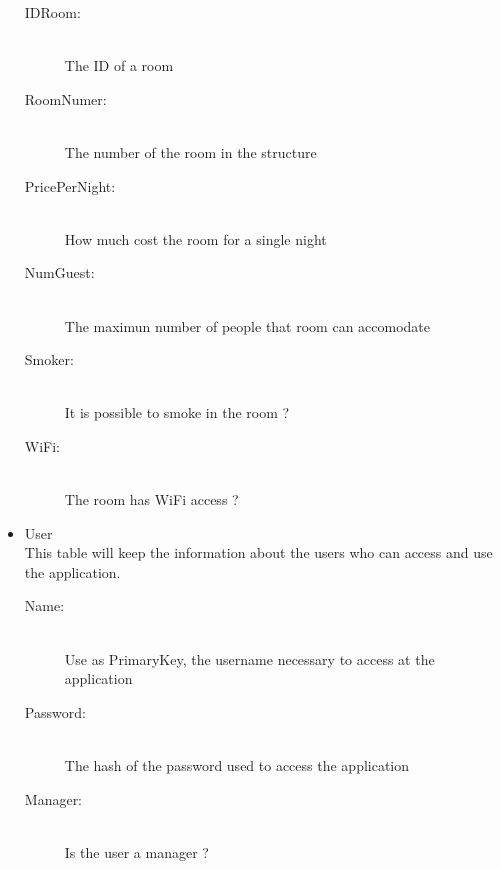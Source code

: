 \begin{itemize}
    \begin{description}
      \item[IDRoom:] \hfill \\ The ID of a room
      \item[RoomNumer:] \hfill \\ The number of the room in the structure
      \item[PricePerNight:] \hfill \\ How much cost the room for a single night  
      \item[NumGuest:] \hfill \\ The maximun number of people that room can accomodate
      \item[Smoker:] \hfill \\ It is possible to smoke in the room ?
      \item[WiFi:] \hfill \\ The room has WiFi access ?
    \end{description}
  \item User \\
    This table will keep the information about the users who can access and use the application.
    \begin{description}
      \item[Name:] \hfill \\ Use as PrimaryKey, the username necessary to access at the application
      \item[Password:] \hfill \\ The hash of the password used to access the application
      \item[Manager:] \hfill \\ Is the user a manager ?
    \end{description}
\end{itemize}
